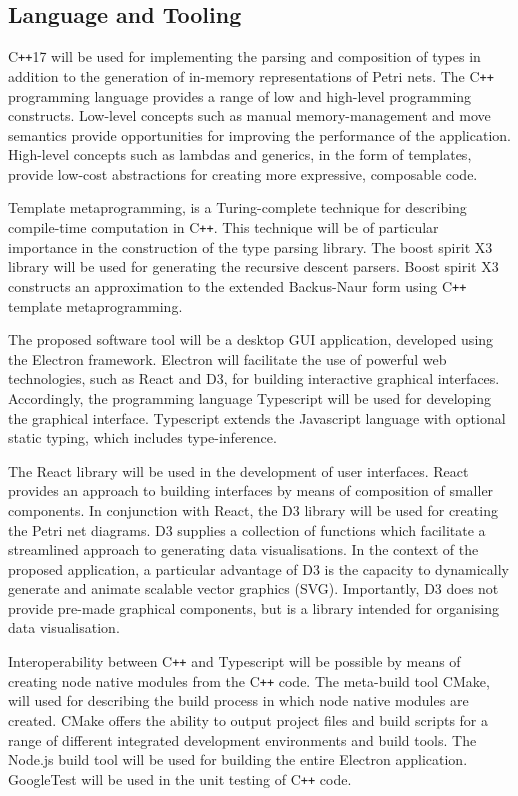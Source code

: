 \documentclass[../Dissertation.tex]{subfiles}
\begin{document}
\subsection{Language and Tooling}
C\lstinline{++}17 will be used for implementing the parsing and composition of types in addition to the generation of in-memory representations of Petri nets. The C\lstinline{++} programming language provides a range of low and high-level programming constructs. Low-level concepts such as manual memory-management and move semantics provide opportunities for improving the performance of the application. High-level concepts such as lambdas and generics, in the form of templates, provide low-cost abstractions for creating more expressive, composable code. 
\par
Template metaprogramming, is a Turing-complete technique for describing compile-time computation in C\lstinline{++}. This technique will be of particular importance in the construction of the type parsing library. The boost spirit X3 library will be used for generating the recursive descent parsers. Boost spirit X3 constructs an approximation to the extended Backus-Naur form using C\lstinline{++} template metaprogramming.
\par
The proposed software tool will be a desktop GUI application, developed using the Electron framework. Electron will facilitate the use of powerful web technologies, such as React and D3, for building interactive graphical interfaces. Accordingly, the programming language Typescript will be used for developing the graphical interface. Typescript extends the Javascript language with optional static typing, which includes type-inference.
\par
The React library will be used in the development of user interfaces. React provides an approach to building interfaces by means of composition of smaller components. In conjunction with React, the D3 library will be used for creating the Petri net diagrams. D3 supplies a collection of functions which facilitate a streamlined approach to generating data visualisations. In the context of the proposed application, a particular advantage of D3 is the capacity to dynamically generate and animate scalable vector graphics (SVG). Importantly, D3 does not provide pre-made graphical components, but is a library intended for organising data visualisation.
\par
Interoperability between C\lstinline{++} and Typescript will be possible by means of creating node native modules from the C\lstinline{++} code. The meta-build tool CMake, will used for describing the build process in which node native modules are created. CMake offers the ability to output project files and build scripts for a range of different integrated development environments and build tools. The Node.js build tool will be used for building the entire Electron application. GoogleTest will be used in the unit testing of C\lstinline{++} code.
\end{document}
